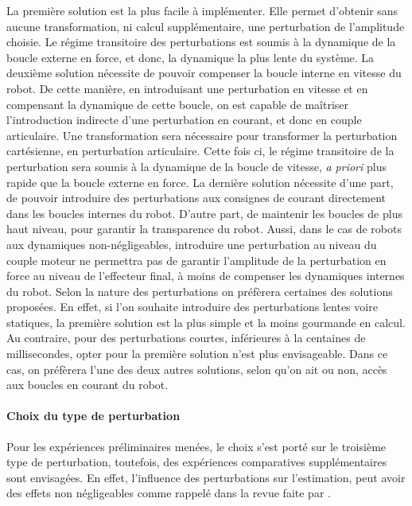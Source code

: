 \documentclass[12pt, a4paper]{article} %
\numberwithin{equation}{section}
\begin{document}
La première solution est la plus facile à implémenter. Elle permet d'obtenir sans aucune transformation, ni calcul supplémentaire, une perturbation de l'amplitude choisie. Le régime transitoire des perturbations est soumis à la dynamique de la boucle externe en force, et donc, la dynamique la plus lente du système.
%
\newlineBlank
%
La deuxième solution nécessite de pouvoir compenser la boucle interne en vitesse du robot. De cette manière, en introduisant une perturbation en vitesse et en compensant la dynamique de cette boucle, on est capable de maîtriser l'introduction indirecte d'une perturbation en courant, et donc en couple articulaire. Une transformation sera nécessaire pour transformer la perturbation cartésienne, en perturbation articulaire. Cette fois ci, le régime transitoire de la perturbation sera soumis à la dynamique de la boucle de vitesse, \textit{a priori} plus rapide que la boucle externe en force.
%
\newlineBlank
%
La dernière solution nécessite d'une part, de pouvoir introduire des perturbations aux consignes de courant directement dans les boucles internes du robot. D'autre part, de maintenir les boucles de plus haut niveau, pour garantir la transparence du robot. Aussi, dans le cas de robots aux dynamiques non-négligeables, introduire une perturbation au niveau du couple moteur ne permettra pas de garantir l'amplitude de la perturbation en force au niveau de l'effecteur final, à moins de compenser les dynamiques internes du robot. 
%
\newlineBlank
%
Selon la nature des perturbations on préfèrera certaines des solutions proposées. En effet, si l'on souhaite introduire des perturbations lentes voire statiques, la première solution est la plus simple et la moins gourmande en calcul. Au contraire, pour des perturbations courtes, inférieures à la centaines de millisecondes, opter pour la première solution n'est plus envisageable. Dans ce cas, on préfèrera l'une des deux autres solutions, selon qu'on ait ou non, accès aux boucles en courant du robot.  

\paragraph{Choix du type de perturbation}

Pour les expériences préliminaires menées, le choix s'est porté sur le troisième type de perturbation, toutefois, des expériences comparatives supplémentaires sont envisagées. En effet, l'influence des perturbations sur l'estimation, peut avoir des effets non négligeables comme rappelé dans la revue faite par \cite{mizrahi_mechanical_2015}.
\end{document}
